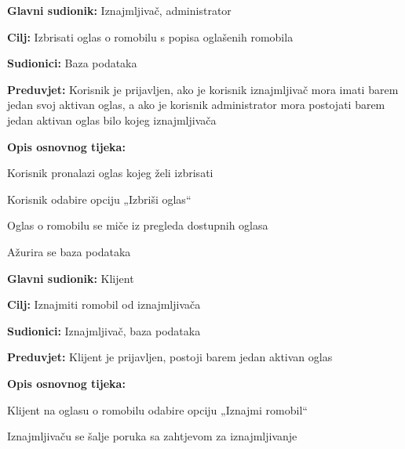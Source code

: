 						\noindent {}
						\begin{packed_item}
							
							\item \textbf{Glavni sudionik: }Iznajmljivač, administrator
							\item  \textbf{Cilj: }Izbrisati oglas o romobilu s popisa oglašenih romobila
							\item  \textbf{Sudionici: }Baza podataka
							\item  \textbf{Preduvjet: }Korisnik je prijavljen, ako je korisnik iznajmljivač mora imati barem jedan svoj aktivan oglas, a ako je korisnik administrator mora postojati barem jedan aktivan oglas bilo kojeg iznajmljivača
							\item  \textbf{Opis osnovnog tijeka:}
							
							\item[] \begin{packed_enum}
								\item Korisnik pronalazi oglas kojeg želi izbrisati
								\item Korisnik odabire opciju „Izbriši oglas“
								\item Oglas o romobilu se miče iz pregleda dostupnih oglasa
								\item Ažurira se baza podataka
								
							\end{packed_enum}	
						\end{packed_item}
						\noindent \underbar{\textbf{UC19 - Iznajmi romobil}}
						\begin{packed_item}
							
							\item \textbf{Glavni sudionik: }Klijent
							\item  \textbf{Cilj: }Iznajmiti romobil od iznajmljivača
							\item  \textbf{Sudionici: }Iznajmljivač, baza podataka
							\item  \textbf{Preduvjet: }Klijent je prijavljen, postoji barem jedan aktivan oglas
							\item  \textbf{Opis osnovnog tijeka:}
							
							\item[] \begin{packed_enum}
								\item Klijent na oglasu o romobilu odabire opciju „Iznajmi romobil“
								\item Iznajmljivaču se šalje poruka sa zahtjevom za iznajmljivanje
							
							\end{packed_enum}	
						\end{packed_item}
